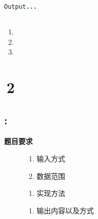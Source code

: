 \documentclass{article}
\begin{document}
\begin{center}
\begin{lstlisting}[language = Java]
Output...
\end{lstlisting}
\end{center}
\subsection{}
\begin{enumerate}
	\item\kaishu
	\item\kaishu
	\item\kaishu
\end{enumerate}
\newpage
\section{\,2}

\subsection{:}
\noindent\kaishu \textbf{题目要求}
\begin{description}
	\item [\kaishu输入]
	\begin{enumerate}
		\item \kaishu 输入方式
		\item \kaishu 数据范围
	\end{enumerate}
	\item [\kaishu实现]
	\begin{enumerate}
		\item 实现方法
		\end{enumerate}
	\item [\kaishu输出]
	\begin{enumerate}
		\item []\kaishu 输出内容以及方式
	\end{enumerate}
\end{description}
\end{document}
